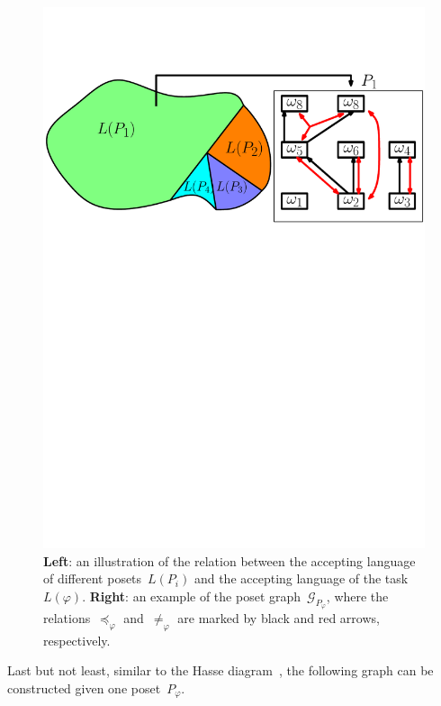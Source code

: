 \begin{figure}[t!]
	\includegraphics[width=0.9\linewidth]{figures/poset_language2.pdf}
	\centering
\caption{\textbf{Left}:
an illustration of the relation between the accepting
language of different posets~$L(P_i)$
and the accepting language of the task~$L(\varphi)$.
\textbf{Right}:
an example of the poset graph~$\mathcal{G}_{P_\varphi}$,
where the relations~$\preceq_{\varphi}$ and~$\neq_{\varphi}$
are marked by black and red arrows, respectively.}
\label{fig:poset_language}
\end{figure}

Last but not least, similar to the Hasse diagram~\cite{simovici2008mathematical},
the following graph can be constructed given one poset~$P_{\varphi}$.

